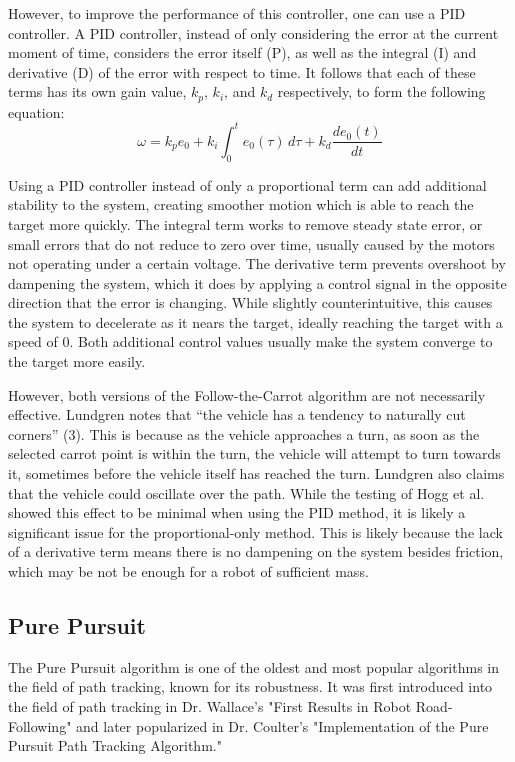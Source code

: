 \documentclass[mla7]{mla}
\begin{document}
\begin{paper}
However, to improve the performance of this controller, one can use a PID controller. A PID controller, instead of only considering the error at the current moment of time, considers the error itself (P), as well as the integral (I) and derivative (D) of the error with respect to time. It follows that each of these terms has its own gain value, $k_p$, $k_i$, and $k_d$ respectively, to form the following equation:
\begin{equation}
\omega = k_p e_0 + k_i \int_0^t \! e_0(\tau) \, d\tau + k_d \frac{de_0(t)}{dt}
\end{equation}

Using a PID controller instead of only a proportional term can add additional stability to the system, creating smoother motion which is able to reach the target more quickly. The integral term works to remove steady state error, or small errors that do not reduce to zero over time, usually caused by the motors not operating under a certain voltage. The derivative term prevents overshoot by dampening the system, which it does by applying a control signal in the opposite direction that the error is changing. While slightly counterintuitive, this causes the system to decelerate as it nears the target, ideally reaching the target with a speed of 0. Both additional control values usually make the system converge to the target more easily.

However, both versions of the Follow-the-Carrot algorithm are not necessarily effective. Lundgren notes that ``the vehicle has a tendency to naturally cut corners'' (3). This is because as the vehicle approaches a turn, as soon as the selected carrot point is within the turn, the vehicle will attempt to turn towards it, sometimes before the vehicle itself has reached the turn. Lundgren also claims that the vehicle could oscillate over the path. While the testing of Hogg et al. showed this effect to be minimal when using the PID method, it is likely a significant issue for the proportional-only method. This is likely because the lack of a derivative term means there is no dampening on the system besides friction, which may be not be enough for a robot of sufficient mass.

\subsection{Pure Pursuit}

The Pure Pursuit algorithm is one of the oldest and most popular algorithms in the field of path tracking, known for its robustness. It was first introduced into the field of path tracking in Dr. Wallace's "First Results in Robot Road-Following" and later popularized in Dr. Coulter's "Implementation of the Pure Pursuit Path Tracking Algorithm."


\end{paper}
\end{document}
